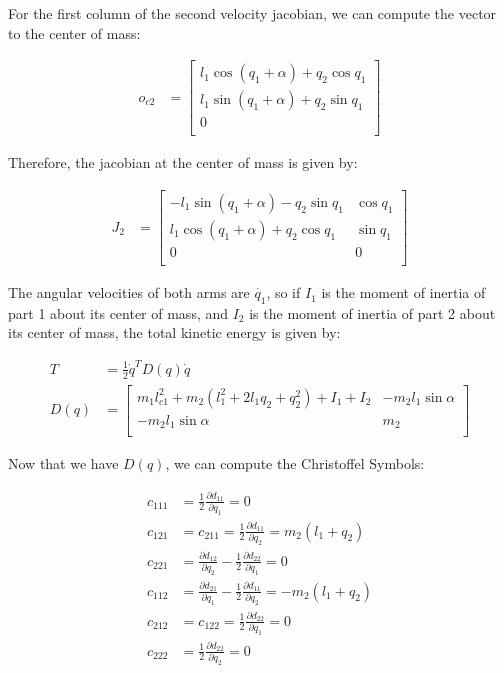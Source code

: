 \documentclass{article}
\begin{document}
For the first column of the second velocity jacobian, we can compute the vector to the center of mass:

\begin{align*}
o_{c2} & = \left[ \begin{matrix} 
	l_1 \cos (q_1 + \alpha) + q_2 \cos q_1 \\ 
	l_1 \sin (q_1 + \alpha) + q_2 \sin q_1 \\
	0 \\
	\end{matrix} \right]
\end{align*}

Therefore, the jacobian at the center of mass is given by:

\begin{align}
J_2 & = \left[ \begin{matrix}
	- l_1 \sin (q_1 + \alpha) - q_2 \sin q_1 & \cos q_1 \\
	l_1 \cos (q_1 + \alpha) + q_2 \cos q_1 & \sin q_1 \\ 
	0 & 0 \\
	\end{matrix} \right]
\end{align}

The angular velocities of both arms are $\dot{q_1}$, so if $I_1$ is the moment of inertia
	of part 1 about its center of mass, and $I_2$ is the moment of inertia of part 2 about
	its center of mass, the total kinetic energy is given by:

\begin{align}
	T & = \frac 1 2 \dot{q}^T D(q) \dot{q}\\
	D(q) & = \left[ \begin{matrix}
		m_1 l_{c1}^2 + m_2 \left( l_1^2 + 2 l_1 q_2 + q_2^2 \right) + I_1 + I_2 
		& - m_2 l_1 \sin \alpha \\
		- m_2 l_1 \sin \alpha & m_2 \\
	\end{matrix} \right]
\end{align}

Now that we have $D(q)$, we can compute the Christoffel Symbols:

\begin{align}
c_{111} & = \frac 12 \frac {\partial d_{11}}{\partial q_1} = 0 \\
c_{121} & = c_{211} = \frac 1 2 \frac {\partial d_{11}}{\partial q_2} = m_2 \left( l_1 + q_2 \right) \\
c_{221} & = \frac {\partial d_{12}}{\partial q_2} - \frac 12 \frac {\partial d_{22}}{\partial q_1}
	= 0 \\ 
c_{112} & = \frac {\partial d_{21}}{\partial q_1} - \frac 12 \frac {\partial d_{11}}{\partial q_2}
	=  - m_2 \left( l_1 + q_2 \right) \\ 
c_{212} & = c_{122} = \frac 12 \frac {\partial d_{22}}{\partial q_1} = 0 \\
c_{222} & = \frac 12 \frac{\partial d_{22}}{\partial q_2} = 0
\end{align}
\end{document}

